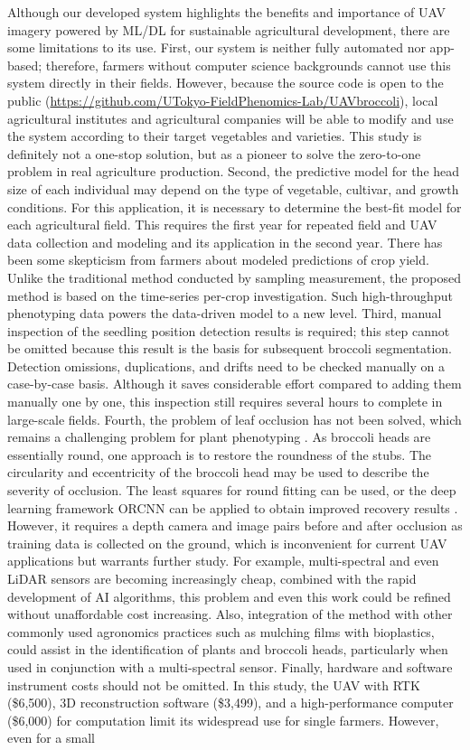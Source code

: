 Although our developed system highlights the benefits and importance of UAV imagery powered by ML/DL for sustainable agricultural development, there are some limitations to its use. First, our system is neither fully automated nor app-based; therefore, farmers without computer science backgrounds cannot use this system directly in their fields. However, because the source code is open to the public (\url{https://github.com/UTokyo-FieldPhenomics-Lab/UAVbroccoli}), local agricultural institutes and agricultural companies will be able to modify and use the system according to their target vegetables and varieties. This study is definitely not a one-stop solution, but as a pioneer to solve the zero-to-one problem in real agriculture production. Second, the predictive model for the head size of each individual may depend on the type of vegetable, cultivar, and growth conditions. For this application, it is necessary to determine the best-fit model for each agricultural field. This requires the first year for repeated field and UAV data collection and modeling and its application in the second year. There has been some skepticism from farmers about modeled predictions of crop yield. Unlike the traditional method conducted by sampling measurement, the proposed method is based on the time-series per-crop investigation. Such high-throughput phenotyping data powers the data-driven model to a new level. Third, manual inspection of the seedling position detection results is required; this step cannot be omitted because this result is the basis for subsequent broccoli segmentation. Detection omissions, duplications, and drifts need to be checked manually on a case-by-case basis. Although it saves considerable effort compared to adding them manually one by one, this inspection still requires several hours to complete in large-scale fields. Fourth, the problem of leaf occlusion has not been solved, which remains a challenging problem for plant phenotyping \citep{zhang_applications_2020}. As broccoli heads are essentially round, one approach is to restore the roundness of the stubs. The circularity and eccentricity of the broccoli head may be used to describe the severity of occlusion. The least squares for round fitting can be used, or the deep learning framework ORCNN can be applied to obtain improved recovery results \citep{blok_image_2021}. However, it requires a depth camera and image pairs before and after occlusion as training data is collected on the ground, which is inconvenient for current UAV applications but warrants further study. For example, multi-spectral and even LiDAR sensors are becoming increasingly cheap, combined with the rapid development of AI algorithms, this problem and even this work could be refined without unaffordable cost increasing. Also, integration of the method with other commonly used agronomics practices such as mulching films with bioplastics, could assist in the identification of plants and broccoli heads, particularly when used in conjunction with a multi-spectral sensor. Finally, hardware and software instrument costs should not be omitted. In this study, the UAV with RTK (\$6,500), 3D reconstruction software (\$3,499), and a high-performance computer (\$6,000) for computation limit its widespread use for single farmers. However, even for a small 